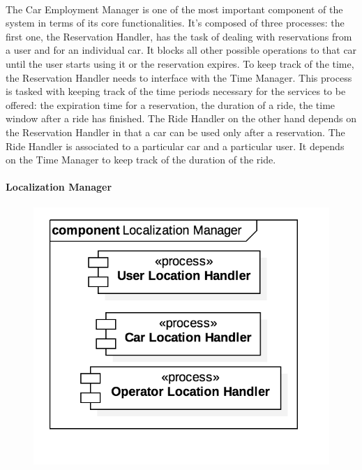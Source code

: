 		\paragraph{} The Car Employment Manager is one of the most important component of the system in terms of its core functionalities. It's composed of three processes: the first one, the Reservation Handler, has the task of dealing with reservations from a user and for an individual car. It blocks all other possible operations to that car until the user starts using it or the reservation expires. To keep track of the time, the Reservation Handler needs to interface with the Time Manager. This process is tasked with keeping track of the time periods necessary for the services to be offered: the expiration time for a reservation, the duration of a ride, the time window after a ride has finished. 
		The Ride Handler on the other hand depends on the Reservation Handler in that a car can be used only after a reservation. The Ride Handler is associated to a particular car and a particular user. It depends on the Time Manager to keep track of the duration of the ride. 
		
		
		\paragraph{Localization Manager}
			\begin{figure}[h]
				\includegraphics[scale=0.4, center]{img/component_diagrams/05_localization_manager.png}
			\end{figure}
			
